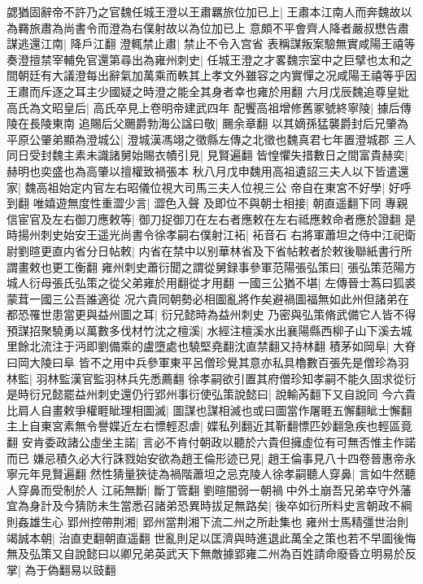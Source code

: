 勰猶固辭帝不許乃之官魏任城王澄以王肅羈旅位加已上|{
	王肅本江南人而奔魏故以為羇旅肅為尚書令而澄為右僕射故以為位加已上}
意頗不平會齊人降者嚴叔懋告肅謀逃還江南|{
	降戶江翻}
澄輒禁止肅|{
	禁止不令入宫省}
表稱謀叛案驗無實咸陽王禧等奏澄擅禁宰輔免官還第尋出為雍州刺史|{
	任城王澄之才畧魏宗室中之巨擘也太和之間朝廷有大議澄每出辭氣加萬乘而軼其上孝文外雖容之内實憚之况咸陽王禧等乎因王肅而斥逐之耳主少國疑之時澄之能全其身者幸也雍於用翻}
六月戊辰魏追尊皇妣高氏為文昭皇后|{
	高氏卒見上卷明帝建武四年}
配饗高祖增修舊冢號終寧陵|{
	據后傳陵在長陵東南}
追賜后父颺爵勃海公諡曰敬|{
	颺余章翻}
以其嫡孫猛襲爵封后兄肇為平原公肇弟顯為澄城公|{
	澄城漢馮翊之徵縣左傳之北徵也魏真君七年置澄城郡}
三人同日受封魏主素未識諸舅始賜衣幘引見|{
	見賢遍翻}
皆惶懼失措數日之間富貴赫奕|{
	赫明也奕盛也為高肇以擅權致禍張本}
秋八月戊申魏用高祖遺詔三夫人以下皆遣還家|{
	魏高祖始定内官左右昭儀位視大司馬三夫人位視三公}
帝自在東宮不好學|{
	好呼到翻}
唯嬉遊無度性重澀少言|{
	澀色入聲}
及即位不與朝士相接|{
	朝直遥翻下同}
專親信宦官及左右御刀應敕等|{
	御刀捉御刀在左右者應敕在左右祗應敕命者應於證翻}
是時揚州刺史始安王遥光尚書令徐孝嗣右僕射江袥|{
	袥音石}
右將軍蕭坦之侍中江祀衛尉劉暄更直内省分日帖敕|{
	内省在禁中以别華林省及下省帖敕者於敕後聯紙書行所謂畫敕也更工衡翻}
雍州刺史蕭衍聞之謂從舅録事參軍范陽張弘策曰|{
	張弘策范陽方城人衍母張氏弘策之從父弟雍於用翻從才用翻}
一國三公猶不堪|{
	左傳晉士蒍曰狐裘蒙茸一國三公吾誰適從}
况六貴同朝勢必相圖亂將作矣避禍圖福無如此州但諸弟在都恐罹世患當更與益州圖之耳|{
	衍兄懿時為益州刺史}
乃密與弘策脩武備它人皆不得預謀招聚驍勇以萬數多伐材竹沈之檀溪|{
	水經注檀溪水出襄陽縣西柳子山下溪去城里餘北流注于沔即劉備乘的盧墮處也驍堅堯翻沈直禁翻又持林翻}
積茅如岡阜|{
	大脊曰岡大陵曰阜}
皆不之用中兵參軍東平呂僧珍覺其意亦私具櫓數百張先是僧珍為羽林監|{
	羽林監漢官監羽林兵先悉薦翻}
徐孝嗣欲引置其府僧珍知孝嗣不能久固求從衍是時衍兄懿罷益州刺史還仍行郢州事衍使弘策說懿曰|{
	說輸芮翻下又自說同}
今六貴比肩人自畫敕爭權睚眦理相圖滅|{
	圖謀也謀相滅也或曰圖當作屠睚五懈翻眦士懈翻}
主上自東宮素無令譽媟近左右慓輕忍虐|{
	媟私列翻近其靳翻慓匹妙翻急疾也輕區竟翻}
安肯委政諸公虛坐主諾|{
	言必不肯付朝政以聽於六貴但擁虛位有可無否惟主作諾而已}
嫌忌積久必大行誅戮始安欲為趙王倫形迹已見|{
	趙王倫事見八十四卷晉惠帝永寧元年見賢遍翻}
然性猜量狹徒為禍階蕭坦之忌克陵人徐孝嗣聽人穿鼻|{
	言如牛然聽人穿鼻而受制於人}
江祏無斷|{
	斷丁管翻}
劉暄闇弱一朝禍中外土崩吾兄弟幸守外藩宜為身計及今猜防未生當悉召諸弟恐異時拔足無路矣|{
	後卒如衍所料史言朝政不綱則姦雄生心}
郢州控帶荆湘|{
	郢州當荆湘下流二州之所赴集也}
雍州士馬精彊世治則竭誠本朝|{
	治直吏翻朝直遥翻}
世亂則足以匡濟與時進退此萬全之策也若不早圖後悔無及弘策又自說懿曰以卿兄弟英武天下無敵據郢雍二州為百姓請命廢昏立明易於反掌|{
	為于偽翻易以豉翻}
